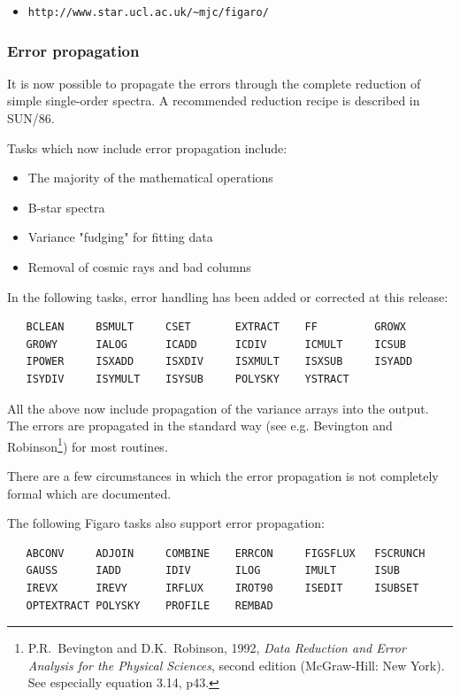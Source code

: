 \documentclass[11pt,twoside]{article}
\begin{document}
\begin{itemize}
   \item {\tt http://www.star.ucl.ac.uk/\~{}mjc/figaro/}
\end{itemize}

\subsubsection{Error propagation}

 It is now possible to propagate the errors through the complete
 reduction of simple single-order spectra.  A recommended reduction
 recipe is described in SUN/86.

 Tasks which now include error propagation include:

\begin{itemize}
\item The majority of the mathematical operations
\item B-star spectra
\item Variance "fudging" for fitting data
\item Removal of cosmic rays and bad columns
\end{itemize}

 In the following tasks, error handling has been added or corrected
 at this release:

\begin{verbatim}
   BCLEAN     BSMULT     CSET       EXTRACT    FF         GROWX
   GROWY      IALOG      ICADD      ICDIV      ICMULT     ICSUB
   IPOWER     ISXADD     ISXDIV     ISXMULT    ISXSUB     ISYADD
   ISYDIV     ISYMULT    ISYSUB     POLYSKY    YSTRACT
\end{verbatim}

 All the above now include propagation of the variance arrays into
 the output.  The errors are propagated in the standard way (see e.g.
 Bevington and Robinson\footnote{P.R.~Bevington and D.K.~Robinson,
 1992, {\it Data Reduction and Error Analysis for the Physical Sciences},
 second edition (McGraw-Hill: New York).  See especially equation 3.14,
 p43.}) for most routines.

 There are a few circumstances in which the error propagation is not
 completely formal which are documented.

 The following Figaro tasks also support error propagation:

\begin{verbatim}
   ABCONV     ADJOIN     COMBINE    ERRCON     FIGSFLUX   FSCRUNCH
   GAUSS      IADD       IDIV       ILOG       IMULT      ISUB
   IREVX      IREVY      IRFLUX     IROT90     ISEDIT     ISUBSET
   OPTEXTRACT POLYSKY    PROFILE    REMBAD
\end{verbatim}
\end{document}
